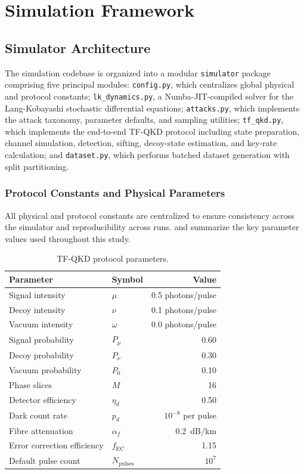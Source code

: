 \documentclass[12pt, a4paper]{report}
\begin{document}
\chapter{Simulation Framework}\label{ch:simulation}

\section{Simulator Architecture}
The simulation codebase is organized into a modular \texttt{simulator} package comprising five principal modules: \texttt{config.py}, which centralizes global physical and protocol constants; \texttt{lk\_dynamics.py}, a Numba-JIT-compiled solver for the Lang-Kobayashi stochastic differential equations; \texttt{attacks.py}, which implements the attack taxonomy, parameter defaults, and sampling utilities; \texttt{tf\_qkd.py}, which implements the end-to-end TF-QKD protocol including state preparation, channel simulation, detection, sifting, decoy-state estimation, and key-rate calculation; and \texttt{dataset.py}, which performs batched dataset generation with split partitioning.

\subsection{Protocol Constants and Physical Parameters}
All physical and protocol constants are centralized to ensure consistency across the simulator and reproducibility across runs.  and  summarize the key parameter values used throughout this study.

\begin{table}[h]
\centering
\caption{TF-QKD protocol parameters.}
\label{tab:protocol_params}
\begin{tabular}{@{}llr@{}}
\toprule
\textbf{Parameter} & \textbf{Symbol} & \textbf{Value} \\
\midrule
Signal intensity & $\mu$ & 0.5 photons/pulse \\
Decoy intensity & $\nu$ & 0.1 photons/pulse \\
Vacuum intensity & $\omega$ & 0.0 photons/pulse \\
Signal probability & $P_\mu$ & 0.60 \\
Decoy probability & $P_\nu$ & 0.30 \\
Vacuum probability & $P_0$ & 0.10 \\
Phase slices & $M$ & 16 \\
Detector efficiency & $\eta_d$ & 0.50 \\
Dark count rate & $p_d$ & $10^{-8}$ per pulse \\
Fibre attenuation & $\alpha_f$ & \SI{0.2}{dB/km} \\
Error correction efficiency & $f_{\text{EC}}$ & 1.15 \\
Default pulse count & $N_{\text{pulses}}$ & $10^7$ \\
\bottomrule
\end{tabular}
\end{table}
\end{document}
